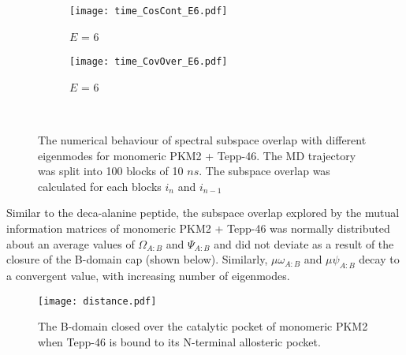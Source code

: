 \documentclass[11pt]{article}
\begin{document}
\begin{figure}[hbt]
\begin{subfigure}[b]{.24\linewidth}
  \end{subfigure}%
  \begin{subfigure}[b]{.24\linewidth}
    \centering
    \texttt{[image: time\_CosCont\_E6.pdf]}
    \caption{$E$ = 6}\label{fig:1k}
  \end{subfigure}%
  \begin{subfigure}[b]{.24\linewidth}
    \centering
    \texttt{[image: time\_CovOver\_E6.pdf]}
    \caption{$E$ = 6}\label{fig:1l}
  \end{subfigure}\\%
\caption{The numerical behaviour of spectral subspace overlap with different eigenmodes for monomeric PKM2 + Tepp-46. The MD trajectory was split into 100 blocks of 10 $ns$. The subspace overlap was calculated for each blocks $i_{n}$ and $i_{n-1}$}\label{fig:1}
\end{figure}
Similar to the deca-alanine peptide, the subspace overlap explored by the mutual information matrices of monomeric PKM2 + Tepp-46 was normally distributed about an average values of $ \Omega_{A:B} $ and $ \Psi_{A:B} $ and did not deviate as a result of the closure of the B-domain cap (shown below). Similarly, $\mu \omega_{A:B} $ and $\mu \psi_{A:B} $ decay to a convergent value, with increasing number of eigenmodes.
\begin{figure}[!ht]
\centering
\texttt{[image: distance.pdf]}
\caption{The B-domain closed over the catalytic pocket of monomeric PKM2 when Tepp-46 is bound to its N-terminal allosteric pocket.}\label{fig:2} 
\end{figure}
\end{document}

